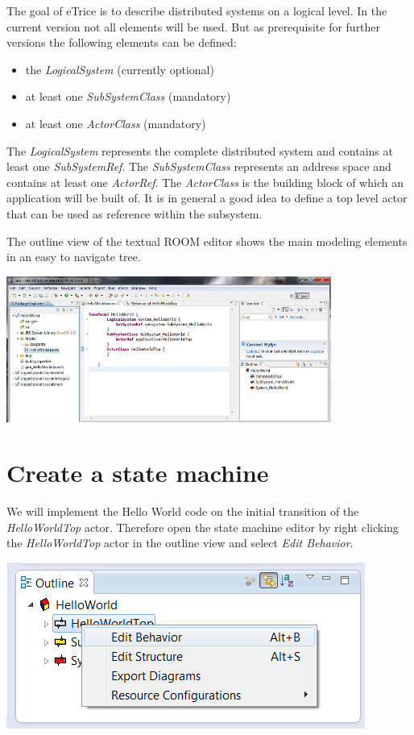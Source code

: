 The goal of eTrice is to describe distributed systems on a logical level. In the current version not all elements will be used. But as prerequisite for further versions the following elements can be defined:
\begin{itemize}
\item the \textit{LogicalSystem} (currently optional)
\item at least one \textit{SubSystemClass} (mandatory)
\item at least one \textit{ActorClass} (mandatory)
\end{itemize}

The \textit{LogicalSystem} represents the complete distributed system and contains at least one \textit{SubSystemRef}. The \textit{SubSystemClass} represents an address space and contains at least one \textit{ActorRef}. The \textit{ActorClass} is the building block of which an application will be built of. It is in general a good idea to define a top level actor that can be used as reference within the subsystem.

The outline view of the textual ROOM editor shows the main modeling elements in an easy to navigate tree.

\includegraphics[width=0.8\textwidth]{images/015-HelloWorld02.png}


\section{Create a state machine}

We will implement the Hello World code on the initial transition of the \textit{HelloWorldTop} actor. Therefore open the state machine editor by right clicking the \textit{HelloWorldTop} actor in the outline view and select \textit{Edit Behavior}.

\includegraphics{images/015-HelloWorld03.png}

